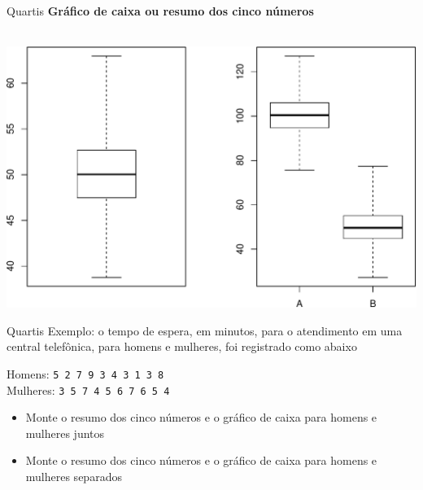 \documentclass[10pt]{beamer}\usepackage[]{graphicx}\usepackage[]{color}
\newenvironment{knitrout}{}{} %
\theoremstyle{definition}
\begin{document}
\begin{frame}{Quartis}
  \textbf{Gráfico de caixa ou resumo dos cinco números}\\~\\
\begin{knitrout}\footnotesize
{}\color{fgcolor}

{\centering \includegraphics[width=.9\textwidth]{figure/unnamed-chunk-5-1} 

}



\end{knitrout}
\end{frame}

\begin{frame}{Quartis}
  Exemplo: o tempo de espera, em minutos, para o atendimento em uma
  central telefônica, para homens e mulheres, foi registrado como abaixo
  \begin{center}
    Homens: \texttt{5 2 7 9 3 4 3 1 3 8}\\
    Mulheres: \texttt{3 5 7 4 5 6 7 6 5 4}
  \end{center}
  \begin{itemize}
  \item Monte o resumo dos cinco números e o gráfico de caixa para
    homens e mulheres juntos
  \item Monte o resumo dos cinco números e o gráfico de caixa para
    homens e mulheres separados
  \end{itemize}

\end{frame}
\end{document}
